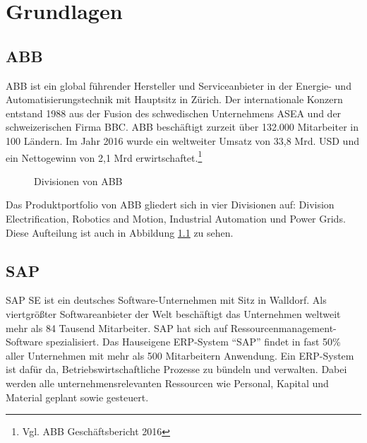 
\chapter{Grundlagen}
\label{ch:Grundlagen}


\section{ABB}

ABB ist ein global f\"{u}hrender Hersteller und Serviceanbieter in der Energie- und Automatisierungstechnik mit Hauptsitz in Z\"{u}rich.
Der internationale Konzern entstand 1988 aus der Fusion des schwedischen Unternehmens \ac{ASEA} und der schweizerischen Firma \ac{BBC}. ABB besch\"{a}ftigt zurzeit \"{u}ber 132.000 Mitarbeiter in 100 L\"{a}ndern. Im Jahr 2016 wurde ein weltweiter Umsatz von 33,8 Mrd. USD und ein Nettogewinn von 2,1 Mrd erwirtschaftet.\footnote{Vgl. ABB Gesch\"{a}ftsbericht 2016} 
\linebreak



\begin{figure}[!hpt]
	\centering
	
	\caption{Divisionen von ABB}
	\label{fig1}
	
\end{figure}

Das Produktportfolio von ABB gliedert sich in vier Divisionen auf: Division Electrification, Robotics and Motion, Industrial Automation und Power Grids. Diese Aufteilung ist auch in Abbildung \ref{fig1} zu sehen.


\section{SAP}
SAP SE ist ein deutsches Software-Unternehmen mit Sitz in Walldorf. Als viertgrößter Softwareanbieter der Welt beschäftigt das Unternehmen weltweit mehr als 84 Tausend Mitarbeiter. SAP hat sich auf Ressourcenmanagement-Software spezialisiert. Das Hauseigene \ac{ERP}-System "`SAP"' findet in fast 50\% aller Unternehmen mit mehr als 500 Mitarbeitern Anwendung. Ein \ac{ERP}-System ist dafür da, Betriebswirtschaftliche Prozesse zu bündeln und verwalten. Dabei werden alle unternehmensrelevanten Ressourcen wie Personal, Kapital und Material geplant sowie gesteuert. 

